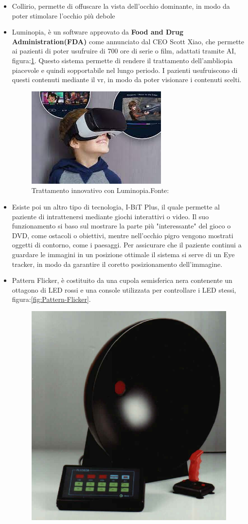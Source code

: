\documentclass[
a4paper,
cleardoublepage=empty,
headings=twolinechapter,
numbers=autoenddot,
]{scrbook}
\begin{document}
\begin{itemize}
		\item Collirio, permette di offuscare la vista dell'occhio dominante, in modo da poter stimolare l'occhio più debole
		
		\item Luminopia, è un software approvato da \textbf{Food and Drug Administration(FDA)}\cite{Approvazione_luminopia} come annunciato dal CEO Scott Xiao, che permette ai pazienti di poter usufruire di 700 ore di serie o film, adattati tramite AI, figura:\ref{fig:luminopia}. Questo sistema permette di rendere il trattamento dell'ambliopia piacevole e quindi sopportabile nel lungo periodo.
		I pazienti usufruiscono di questi contenuti mediante il vr, in modo da poter visionare i contenuti scelti.
			\begin{figure}[H]
				\centering
				\includegraphics[width=0.6\linewidth]{image/luminopia}
				\caption{Trattamento innovativo con Luminopia.Fonte:\cite{Lumiopia_image}}
				\label{fig:luminopia}
			\end{figure}
	    \item Esiste poi un altro tipo di tecnologia, I-BiT Plus\cite{I-Bit}, il quale permette al paziente di intrattenersi mediante giochi interattivi o video.
	    Il suo funzionamento si baso sul mostrare la parte più "interessante" del gioco o DVD, come ostacoli o obiettivi, mentre nell'occhio pigro vengono mostrati oggetti di contorno, come i paesaggi.
	    Per assicurare che il paziente continui a guardare le immagini in un posizione ottimale il sistema si serve di un Eye tracker, in modo da garantire il coretto posizionamento dell'immagine.
	    	\item Pattern Flicker\cite{Pattern-Flicker}, è costituito da una cupola semisferica nera contenente un ottagono di LED rossi e una console utilizzata per controllare i LED stessi, figura:\ref{fig:Pattern-Flicker}.
	    \begin{figure}[H]
	    	\centering
	    	\includegraphics[width=0.4\linewidth]{image/Pattern_Flicker}

\end{figure}
\end{itemize}
\end{document}
